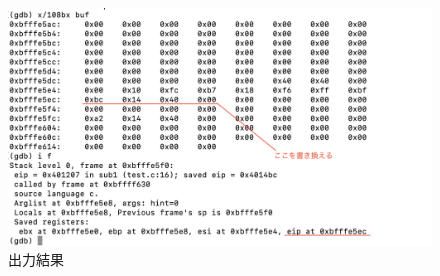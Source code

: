 \documentclass[dvipdfmx,autodetect-engine,titlepage]{jsarticle}
\begin{document}
\begin{figure}[htbp]
  \centering
  \includegraphics[scale=0.8]{pic7.png}
  \caption{出力結果}
\end{figure}
\end{document}
